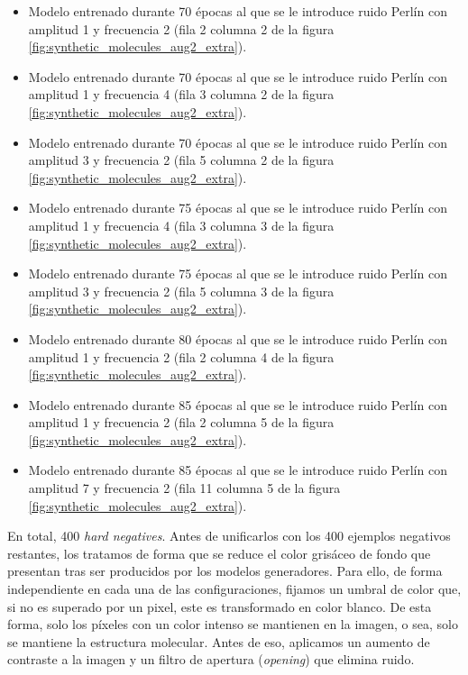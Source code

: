 \begin{itemize}
    \item Modelo entrenado durante 70 épocas al que se le introduce ruido Perlín con amplitud 1 y frecuencia 2 (fila 2 columna 2 de la figura \ref{fig:synthetic_molecules_aug2_extra}).
    \item Modelo entrenado durante 70 épocas al que se le introduce ruido Perlín con amplitud 1 y frecuencia 4 (fila 3 columna 2 de la figura \ref{fig:synthetic_molecules_aug2_extra}).
    \item Modelo entrenado durante 70 épocas al que se le introduce ruido Perlín con amplitud 3 y frecuencia 2 (fila 5 columna 2 de la figura \ref{fig:synthetic_molecules_aug2_extra}).
    \item Modelo entrenado durante 75 épocas al que se le introduce ruido Perlín con amplitud 1 y frecuencia 4 (fila 3 columna 3 de la figura \ref{fig:synthetic_molecules_aug2_extra}).
    \item Modelo entrenado durante 75 épocas al que se le introduce ruido Perlín con amplitud 3 y frecuencia 2 (fila 5 columna 3 de la figura \ref{fig:synthetic_molecules_aug2_extra}).
    \item Modelo entrenado durante 80 épocas al que se le introduce ruido Perlín con amplitud 1 y frecuencia 2 (fila 2 columna 4 de la figura \ref{fig:synthetic_molecules_aug2_extra}).
    \item Modelo entrenado durante 85 épocas al que se le introduce ruido Perlín con amplitud 1 y frecuencia 2 (fila 2 columna 5 de la figura \ref{fig:synthetic_molecules_aug2_extra}).
    \item Modelo entrenado durante 85 épocas al que se le introduce ruido Perlín con amplitud 7 y frecuencia 2 (fila 11 columna 5 de la figura \ref{fig:synthetic_molecules_aug2_extra}).
\end{itemize}

En total, 400 \textit{hard negatives}. Antes de unificarlos con los 400 ejemplos negativos restantes, los tratamos de forma que se reduce el color grisáceo de fondo que presentan tras ser producidos por los modelos generadores. Para ello, de forma independiente en cada una de las configuraciones, fijamos un umbral de color que, si no es superado por un pixel, este es transformado en color blanco. De esta forma, solo los píxeles con un color intenso se mantienen en la imagen, o sea, solo se mantiene la estructura molecular. Antes de eso, aplicamos un aumento de contraste a la imagen y un filtro de apertura (\textit{opening}) que elimina ruido.

